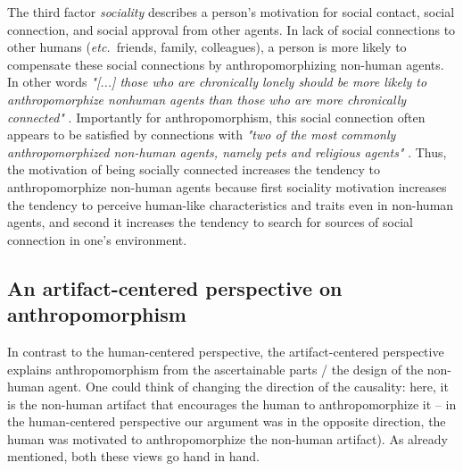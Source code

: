\documentclass{frontiersSCNS} %
\newcommand{\etc}{{\textit{etc.~}}}
\begin{document}
The third factor \textit{sociality} describes a person's motivation for social contact, social connection, and social approval from other agents. In lack of social connections to other humans (\etc friends, family, colleagues), a person is more likely to compensate these social connections by anthropomorphizing non-human agents. In other words \textit{"[...] those who are chronically lonely should be more likely to anthropomorphize nonhuman agents than those who are more chronically connected"} \citep{epley_seeing_2007}. Importantly for anthropomorphism, this social connection often appears to be satisfied by connections with \textit{"two of the most commonly anthropomorphized non-human agents, namely pets and religious agents"} \citep{epley_seeing_2007}. Thus, the motivation of being socially connected increases the tendency to anthropomorphize non-human agents because first sociality motivation increases the tendency to perceive human-like characteristics and traits even in non-human agents, and second it increases the tendency to search for sources of social connection in one's environment.

  

%
%
%
%
%
%

\subsection{An artifact-centered perspective on anthropomorphism}
\label{sec:anthropomorphic-design}

In contrast to the human-centered perspective, the artifact-centered perspective explains anthropomorphism from the ascertainable parts / the design of the non-human agent.
One could think of changing the direction of the causality: here, it is the non-human artifact that encourages the human to anthropomorphize it -- in the human-centered perspective our argument was in the opposite direction, the human was motivated to anthropomorphize the non-human artifact). As already mentioned, both these views go hand in hand.
\end{document}
